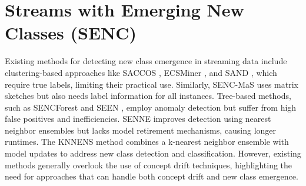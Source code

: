 \section{Streams with Emerging New Classes (SENC)}
\label{sec:3_4_emergence}
Existing methods for detecting new class emergence in streaming data include clustering-based approaches like SACCOS \cite{gao2020saccos}, ECSMiner \cite{masud2010classification}, and SAND \cite{haque2016sand}, which require true labels, limiting their practical use. Similarly, SENC-MaS \cite{mu2017streaming} uses matrix sketches but also needs label information for all instances. Tree-based methods, such as SENCForest \cite{mu2017classification} and SEEN \cite{zhu2020semi}, employ anomaly detection but suffer from high false positives and inefficiencies. SENNE \cite{cai2019nearest} improves detection using nearest neighbor ensembles but lacks model retirement mechanisms, causing longer runtimes. The KNNENS \cite{zhang2022knnens} method combines a k-nearest neighbor ensemble with model updates to address new class detection and classification. However, existing methods generally overlook the use of concept drift techniques, highlighting the need for approaches that can handle both concept drift and new class emergence.

